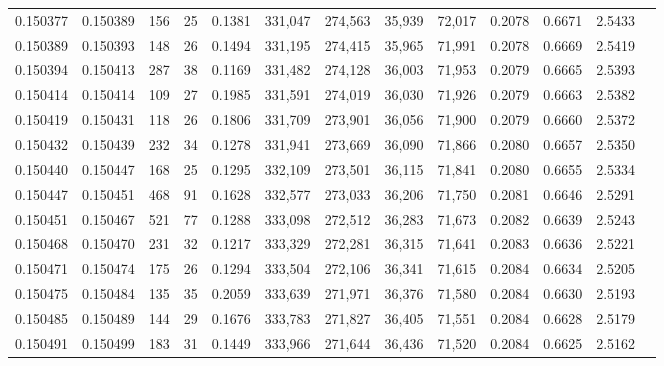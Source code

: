 \begin{tabular}{rrrrrrrrrrrrr}
0.150377 & 0.150389 &   156 &  25 &                                     0.1381 & 331,047 & 274,563 &  35,939 &  72,017 & 0.2078 & 0.6671 & 2.5433 \\
0.150389 & 0.150393 &   148 &  26 &                                     0.1494 & 331,195 & 274,415 &  35,965 &  71,991 & 0.2078 & 0.6669 & 2.5419 \\
0.150394 & 0.150413 &   287 &  38 &                                     0.1169 & 331,482 & 274,128 &  36,003 &  71,953 & 0.2079 & 0.6665 & 2.5393 \\
0.150414 & 0.150414 &   109 &  27 &                                     0.1985 & 331,591 & 274,019 &  36,030 &  71,926 & 0.2079 & 0.6663 & 2.5382 \\
0.150419 & 0.150431 &   118 &  26 &                                     0.1806 & 331,709 & 273,901 &  36,056 &  71,900 & 0.2079 & 0.6660 & 2.5372 \\
0.150432 & 0.150439 &   232 &  34 &                                     0.1278 & 331,941 & 273,669 &  36,090 &  71,866 & 0.2080 & 0.6657 & 2.5350 \\
0.150440 & 0.150447 &   168 &  25 &                                     0.1295 & 332,109 & 273,501 &  36,115 &  71,841 & 0.2080 & 0.6655 & 2.5334 \\
0.150447 & 0.150451 &   468 &  91 &                                     0.1628 & 332,577 & 273,033 &  36,206 &  71,750 & 0.2081 & 0.6646 & 2.5291 \\
0.150451 & 0.150467 &   521 &  77 &                                     0.1288 & 333,098 & 272,512 &  36,283 &  71,673 & 0.2082 & 0.6639 & 2.5243 \\
0.150468 & 0.150470 &   231 &  32 &                                     0.1217 & 333,329 & 272,281 &  36,315 &  71,641 & 0.2083 & 0.6636 & 2.5221 \\
0.150471 & 0.150474 &   175 &  26 &                                     0.1294 & 333,504 & 272,106 &  36,341 &  71,615 & 0.2084 & 0.6634 & 2.5205 \\
0.150475 & 0.150484 &   135 &  35 &                                     0.2059 & 333,639 & 271,971 &  36,376 &  71,580 & 0.2084 & 0.6630 & 2.5193 \\
0.150485 & 0.150489 &   144 &  29 &                                     0.1676 & 333,783 & 271,827 &  36,405 &  71,551 & 0.2084 & 0.6628 & 2.5179 \\
0.150491 & 0.150499 &   183 &  31 &                                     0.1449 & 333,966 & 271,644 &  36,436 &  71,520 & 0.2084 & 0.6625 & 2.5162 \\

\end{tabular}
